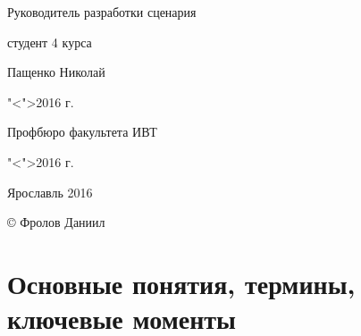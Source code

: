 \documentclass[a4paper, 14pt]{extarticle}
\theoremstyle{definition}
\begin{document}
{\medskip

\begin{flushright}
	Руководитель разработки сценария\par
	студент 4 курса\par
	\underline{\hspace{3.5cm}}Пащенко Николай\par
	"<\underline{\hspace{0.8cm}}">\underline{\hspace{3.5cm}}2016 г.\par
\end{flushright}

\bigskip 
\bigskip

\begin{flushright}
	Профбюро факультета ИВТ\par
	"<\underline{\hspace{0.8cm}}">\underline{\hspace{3.5cm}}2016 г.\par
\end{flushright}

\vspace{\fill}

\begin{center}
	Ярославль 2016
\end{center}

\begin{flushright}
	\copyright \hspace{0.1cm} Фролов Даниил
\end{flushright}

\clearpage
}


\tableofcontents



\section{Основные понятия, термины, ключевые моменты}
\end{document}
